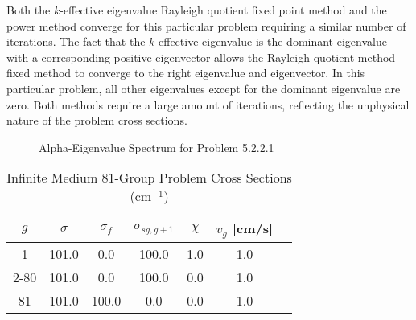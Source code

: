 Both the $k$-effective eigenvalue Rayleigh quotient fixed point method and the power method converge for this particular problem requiring a similar number of iterations. The fact that the $k$-effective eigenvalue is the dominant eigenvalue with a corresponding positive eigenvector allows the Rayleigh quotient method fixed method to converge to the right eigenvalue and eigenvector. In this particular problem, all other eigenvalues except for the dominant eigenvalue are zero. Both methods require a large amount of iterations, reflecting the unphysical nature of the problem cross sections. 

\begin{figure}
\centering
	\resizebox{0.75\textwidth}{!}{
	}
\caption{Alpha-Eigenvalue Spectrum for Problem 5.2.2.1}
\label{fig:G81Spec}
\end{figure}

\begin{table}[]
    \centering
    \caption{Infinite Medium 81-Group Problem Cross Sections (cm$^{-1}$)}
\label{table:G81}
    \begin{tabular}{*7c}
        \toprule
	$g$ & $\sigma$ & $\sigma_{f}$ & $\sigma_{sg,g+1}$ & $\chi$ & $v_{g}$ [cm/s] \\ 
        \midrule
	1 & 101.0 & 0.0 & 100.0 & 1.0 & 1.0 \\
	2-80 & 101.0 & 0.0 & 100.0 & 0.0 & 1.0 \\
	81 & 101.0 & 100.0 & 0.0 & 0.0 & 1.0 \\
        \bottomrule
    \end{tabular}
\end{table}

\begin{table}[H]
    \centering
    \caption{Transport Sweeps for Convergence for Problem 5.2.2.1}
\label{table:G81a}
\end{table}


